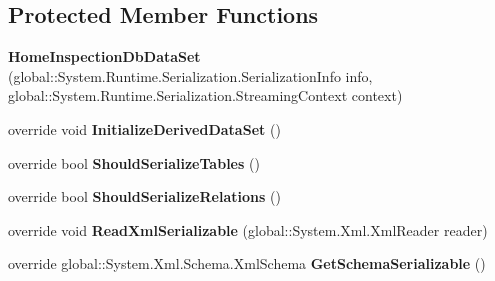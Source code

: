 \subsection*{Protected Member Functions}
\begin{DoxyCompactItemize}
\item 
\mbox{\label{class_a_f_h___scheduler_1_1_home_inspection_db_data_set_a3fbe7481d62e420b29a6b0dd6e78645d}} 
{\bfseries Home\+Inspection\+Db\+Data\+Set} (global\+::\+System.\+Runtime.\+Serialization.\+Serialization\+Info info, global\+::\+System.\+Runtime.\+Serialization.\+Streaming\+Context context)
\item 
\mbox{\label{class_a_f_h___scheduler_1_1_home_inspection_db_data_set_a6c3650e981d856a2b21557675d692f11}} 
override void {\bfseries Initialize\+Derived\+Data\+Set} ()
\item 
\mbox{\label{class_a_f_h___scheduler_1_1_home_inspection_db_data_set_a01bb5333f2d7bf6bc6392d4f25f0dc75}} 
override bool {\bfseries Should\+Serialize\+Tables} ()
\item 
\mbox{\label{class_a_f_h___scheduler_1_1_home_inspection_db_data_set_af1e3ffff058ba760deb48973e2784554}} 
override bool {\bfseries Should\+Serialize\+Relations} ()
\item 
\mbox{\label{class_a_f_h___scheduler_1_1_home_inspection_db_data_set_aa172dc0d025c43d671266a3a93fb589b}} 
override void {\bfseries Read\+Xml\+Serializable} (global\+::\+System.\+Xml.\+Xml\+Reader reader)
\item 
\mbox{\label{class_a_f_h___scheduler_1_1_home_inspection_db_data_set_ada6223280fd164b02c13d85adb48e928}} 
override global\+::\+System.\+Xml.\+Schema.\+Xml\+Schema {\bfseries Get\+Schema\+Serializable} ()
\end{DoxyCompactItemize}
